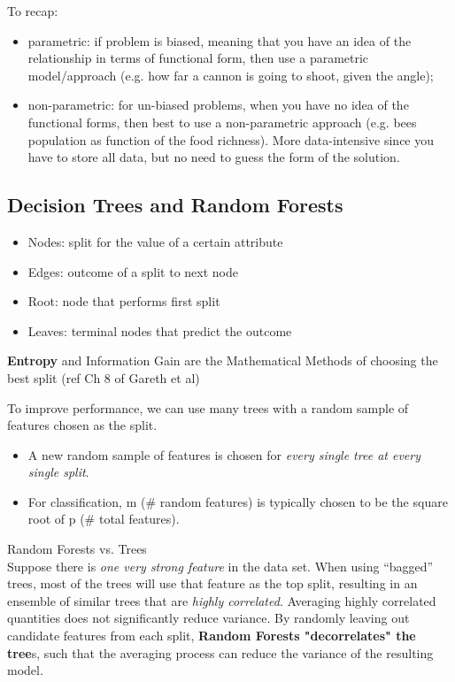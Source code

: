 \documentclass[12pt]{article}
\begin{document}
To recap:
\begin{itemize}
	\item parametric: if problem is biased, meaning that you have an idea of the relationship in terms of functional form, then use a parametric model/approach (e.g. how far a cannon is going to shoot, given the angle);
	\item non-parametric: for un-biased problems, when you have no idea of the functional forms, then best to use a non-parametric approach (e.g. bees population as function of the food richness). More data-intensive since you have to store all data, but no need to guess the form of the solution.
\end{itemize}

\subsection{Decision Trees and Random Forests}
\begin{itemize}
	\item Nodes: split for the value of a certain attribute
	\item Edges: outcome of a split to next node
\end{itemize}

\begin{itemize}
	\item Root: node that performs first split
	\item Leaves: terminal nodes that predict the outcome
\end{itemize}

\textbf{Entropy} and Information Gain are the Mathematical Methods of choosing the best split (ref Ch 8 of Gareth et al)

To improve performance, we can use many trees with a random sample of features chosen as the split.
\begin{itemize}
	\item  A new random sample of features is chosen for \textit{every single tree at every single split}.
	\item For classification, m (\# random features) is typically chosen to be the square root of p (\# total features).
\end{itemize}

Random Forests vs. Trees \\
Suppose there is \textit{one very strong feature} in the data set. When using “bagged” trees, most of the trees will use that feature as the top split, resulting in an ensemble of similar trees that are \textit{highly correlated}. Averaging highly correlated quantities does not significantly reduce variance. By randomly leaving out candidate features from each split, \textbf{Random Forests "decorrelates" the tree}s, such that the averaging process can reduce the variance of the resulting model.
\end{document}
